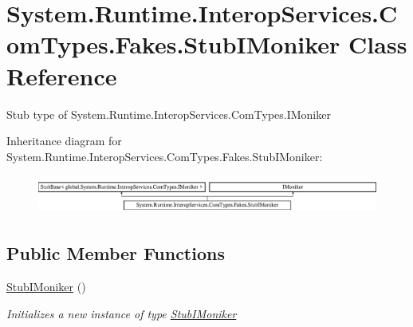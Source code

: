 \hypertarget{class_system_1_1_runtime_1_1_interop_services_1_1_com_types_1_1_fakes_1_1_stub_i_moniker}{\section{System.\-Runtime.\-Interop\-Services.\-Com\-Types.\-Fakes.\-Stub\-I\-Moniker Class Reference}
\label{class_system_1_1_runtime_1_1_interop_services_1_1_com_types_1_1_fakes_1_1_stub_i_moniker}
}


Stub type of System.\-Runtime.\-Interop\-Services.\-Com\-Types.\-I\-Moniker 


Inheritance diagram for System.\-Runtime.\-Interop\-Services.\-Com\-Types.\-Fakes.\-Stub\-I\-Moniker\-:\begin{figure}[H]
\begin{center}
\leavevmode
\includegraphics[height=1.296296cm]{class_system_1_1_runtime_1_1_interop_services_1_1_com_types_1_1_fakes_1_1_stub_i_moniker}
\end{center}
\end{figure}
\subsection*{Public Member Functions}
\begin{DoxyCompactItemize}
\item 
\hyperlink{class_system_1_1_runtime_1_1_interop_services_1_1_com_types_1_1_fakes_1_1_stub_i_moniker_a39088f765410108d54310bd77324f737}{Stub\-I\-Moniker} ()
\begin{DoxyCompactList}\small\item\em Initializes a new instance of type \hyperlink{class_system_1_1_runtime_1_1_interop_services_1_1_com_types_1_1_fakes_1_1_stub_i_moniker}{Stub\-I\-Moniker}\end{DoxyCompactList}\end{DoxyCompactItemize}
